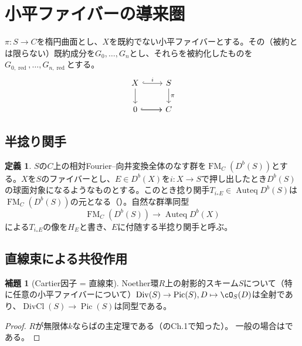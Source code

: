 \documentclass[uplatex, a4paper, dvipdfmx]{jsarticle}
\theoremstyle{definition}
\newtheorem{definition}[theorem]{定義}
\newtheorem{lemma}[theorem]{補題}
\DeclareMathOperator{\Auteq}{\mathrm{Auteq}}
\DeclareMathOperator{\Pic}{\mathrm{Pic}}
\DeclareMathOperator{\FM}{\mathrm{FM}}
\DeclareMathOperator{\red}{\mathrm{red}}
\DeclareMathOperator{\Div}{\mathrm{Div}}
\DeclareMathOperator{\DivCl}{\mathrm{DivCl}}
\begin{document}
\section{小平ファイバーの導来圏}
$\pi \colon S \to C$を楕円曲面とし、$X$を既約でない小平ファイバーとする。その（被約とは限らない）既約成分を$G_0, \dots, G_n$とし、それらを被約化したものを$G_{0, \red}, \dots, G_{n, \red}$とする。
\[
    \begin{tikzcd}
        X \ar[r, hookrightarrow, "i"] \ar[d] & S \ar[d, "\pi"] \\
        0 \ar[r, hookrightarrow] \ar[r] & C
    \end{tikzcd}
\]
\subsection{半捻り関手}

\begin{definition}
    $S$の$C$上の相対Fourier--向井変換全体のなす群を$\FM_C(D^b(S))$とする。$X$を$S$のファイバーとし、$E \in D^b(X)$を$i \colon X \to S$で押し出したとき$D^b(S)$の球面対象になるようなものとする。このとき捻り関手$T_{i_*E} \in \Auteq D^b(S)$は$\FM_C(D^b(S))$の元となる（\cite{2023arXiv230212501A}）。自然な群準同型
    \begin{equation}
        \FM_C(D^b(S)) \to \Auteq D^b(X)
    \end{equation}
    による$T_{i_*E}$の像を$H_E$と書き、$E$に付随する半捻り関手と呼ぶ。
\end{definition}
\subsection{直線束による共役作用}
\begin{lemma}[Cartier因子 = 直線束]\label{lem:cartier-divisor-on-projective-scheme}
    Noether環$R$上の射影的スキーム$S$について（特に任意の小平ファイバーについて）$\Div(S) \to \Pic(S), D \mapsto \cO_S(D)$は全射であり、$\DivCl(S) \to \Pic(S)$は同型である。
\end{lemma}
\begin{proof}
    $R$が無限体$k$ならば\cite{MR0155830}の主定理である（\cite{MR2095471}のCh.1で知った）。
    一般の場合は\cite[Cor.11.28]{MR2675155}である。
\end{proof}
\end{document}
